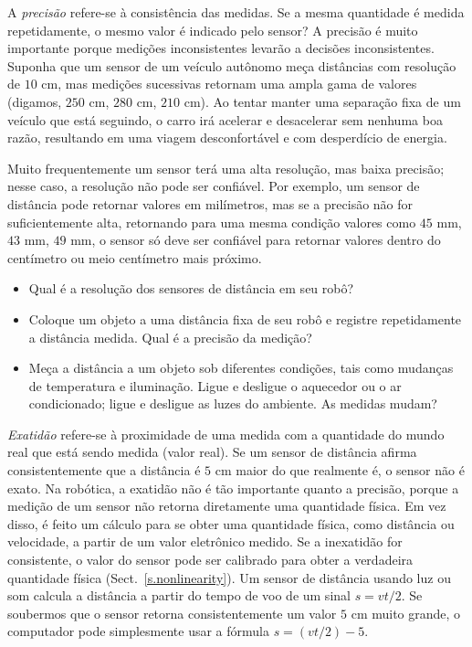 A \emph{precisão} refere-se à consistência das medidas. Se a mesma quantidade é medida repetidamente, o mesmo valor é indicado pelo sensor? A precisão é muito importante porque medições inconsistentes levarão a decisões inconsistentes. Suponha que um sensor de um veículo autônomo meça distâncias com resolução de $10$ cm, mas medições sucessivas retornam uma ampla gama de valores (digamos, $250$ cm, $280$ cm, $210$ cm). Ao tentar manter uma separação fixa de um veículo que está seguindo, o carro irá acelerar e desacelerar sem nenhuma boa razão, resultando em uma viagem desconfortável e com desperdício de energia.

Muito frequentemente um sensor terá uma alta resolução, mas baixa precisão; nesse caso, a resolução não pode ser confiável. Por exemplo, um sensor de distância pode retornar valores em milímetros, mas se a precisão não for suficientemente alta, retornando para uma mesma condição valores como $45$ mm, $43$ mm, $49$ mm, o sensor só deve ser confiável para retornar valores dentro do centímetro ou meio centímetro mais próximo.

\begin{framed}
\begin{itemize}
\item Qual é a resolução dos sensores de distância em seu robô?
\item Coloque um objeto a uma distância fixa de seu robô e registre repetidamente a distância medida. Qual é a precisão da medição?
\item Meça a distância a um objeto sob diferentes condições, tais como mudanças de temperatura e iluminação. Ligue e desligue o aquecedor ou o ar condicionado; ligue e desligue as luzes do ambiente. As medidas mudam?
\end{itemize}
\end{framed}

\emph{Exatidão} refere-se à proximidade de uma medida com a quantidade do mundo real que está sendo medida (valor real). Se um sensor de distância afirma consistentemente que a distância é $5$ cm maior do que realmente é, o sensor não é exato. Na robótica, a exatidão não é tão importante quanto a precisão, porque a medição de um sensor não retorna diretamente uma quantidade física. Em vez disso, é feito um cálculo para se obter uma quantidade física, como distância ou velocidade, a partir de um valor eletrônico medido. Se a inexatidão for consistente, o valor do sensor pode ser calibrado para obter a verdadeira quantidade física (Sect.~\ref{s.nonlinearity}). Um sensor de distância usando luz ou som calcula a distância a partir do tempo de voo de um sinal $s=vt/2$. Se soubermos que o sensor retorna consistentemente um valor $5$ cm muito grande, o computador pode simplesmente usar a fórmula $s=(vt/2) - 5$.

